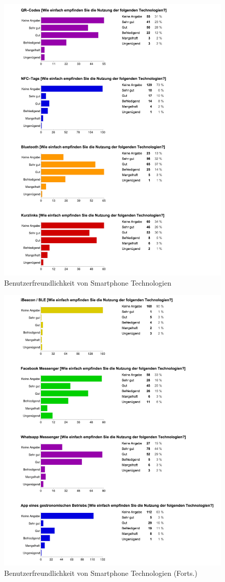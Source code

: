 \begin{figure}[H]
\begin{center}
\includegraphics[width=.9\textwidth]{u04a.jpg}
\caption{Benutzerfreundlichkeit von Smartphone Technologien}
\label{pic:aus4a}
\end{center}
\end{figure}

\begin{figure}[H]
\begin{center}
\includegraphics[width=.9\textwidth]{u04b.jpg}
\caption{Benutzerfreundlichkeit von Smartphone Technologien (Forts.)}
\label{pic:aus4b}
\end{center}
\end{figure}


